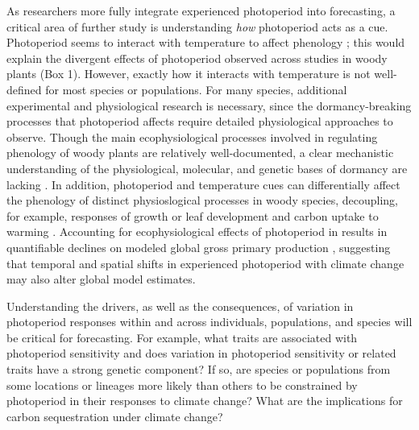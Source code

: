 \documentclass{article}
\begin{document}
\par As researchers more fully integrate experienced photoperiod into forecasting, a critical area of further study is understanding \emph{how} photoperiod acts as a cue. Photoperiod seems to interact with temperature to affect phenology \citep[e.g., Box 1,][]{zydlewski2014}; this would explain the divergent effects of photoperiod observed across studies in woody plants (Box 1). However, exactly how it interacts with temperature is not well-defined for most species or populations. For many species, additional experimental and physiological research is necessary, since the dormancy-breaking processes that photoperiod affects require detailed physiological approaches to observe. Though the main ecophysiological processes involved in regulating phenology of woody plants are relatively well-documented, a clear mechanistic understanding of the physiological, molecular, and genetic bases of dormancy are lacking \citep[Box 2][]{hanninen2019, chuine2016}. In addition, photoperiod and temperature cues can differentially affect the phenology of distinct physioslogical processes in woody species, decoupling, for example, responses of growth or leaf development and carbon uptake to warming \citep{bauerle2012,stinziano2017}. Accounting for ecophysiological effects of photoperiod in results in quantifiable declines on modeled global gross primary production \citep{bauerle2012}, suggesting that temporal and spatial shifts in experienced photoperiod with climate change may also alter global model estimates.
\par Understanding the drivers, as well as the consequences, of variation in photoperiod responses within and across individuals, populations, and species will be critical for forecasting.  For example, what traits are associated with photoperiod sensitivity and does variation in photoperiod sensitivity or related traits have a strong genetic component? If so, are species or populations from some locations or lineages more likely than others to be constrained by photoperiod in their responses to climate change? What are the implications for carbon sequestration under climate change?
\end{document}
